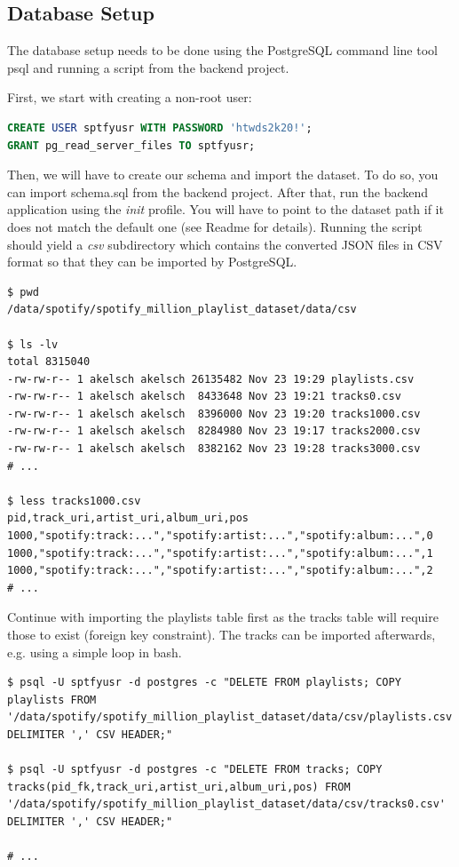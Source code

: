 \subsection{Database Setup}

The database setup needs to be done using the PostgreSQL command line tool psql and running a script from the backend project.

First, we start with creating a non-root user:

\begin{lstlisting}[caption={Creating a user in PostgreSQL}, style=Base, language=SQL]
CREATE USER sptfyusr WITH PASSWORD 'htwds2k20!';
GRANT pg_read_server_files TO sptfyusr;
\end{lstlisting}

Then, we will have to create our schema and import the dataset. To do so, you can import schema.sql from the backend project. After that, run the backend application using the \textit{init} profile. You will have to point to the dataset path if it does not match the default one (see Readme for details). Running the script should yield a \textit{csv} subdirectory which contains the converted \acs{JSON} files in \acs{CSV} format so that they can be imported by PostgreSQL.

\begin{lstlisting}[caption={Expected \acs{CSV} output after running the init script}, style=Terminal]
$ pwd
/data/spotify/spotify_million_playlist_dataset/data/csv

$ ls -lv
total 8315040
-rw-rw-r-- 1 akelsch akelsch 26135482 Nov 23 19:29 playlists.csv
-rw-rw-r-- 1 akelsch akelsch  8433648 Nov 23 19:21 tracks0.csv
-rw-rw-r-- 1 akelsch akelsch  8396000 Nov 23 19:20 tracks1000.csv
-rw-rw-r-- 1 akelsch akelsch  8284980 Nov 23 19:17 tracks2000.csv
-rw-rw-r-- 1 akelsch akelsch  8382162 Nov 23 19:28 tracks3000.csv
# ...

$ less tracks1000.csv
pid,track_uri,artist_uri,album_uri,pos
1000,"spotify:track:...","spotify:artist:...","spotify:album:...",0
1000,"spotify:track:...","spotify:artist:...","spotify:album:...",1
1000,"spotify:track:...","spotify:artist:...","spotify:album:...",2
# ...
\end{lstlisting}

Continue with importing the playlists table first as the tracks table will require those to exist (foreign key constraint). The tracks can be imported afterwards, e.g. using a simple loop in bash.

\begin{lstlisting}[caption={Importing \acs{CSV} files into PostgreSQL}, style=Terminal]
$ psql -U sptfyusr -d postgres -c "DELETE FROM playlists; COPY playlists FROM '/data/spotify/spotify_million_playlist_dataset/data/csv/playlists.csv' DELIMITER ',' CSV HEADER;"

$ psql -U sptfyusr -d postgres -c "DELETE FROM tracks; COPY tracks(pid_fk,track_uri,artist_uri,album_uri,pos) FROM '/data/spotify/spotify_million_playlist_dataset/data/csv/tracks0.csv' DELIMITER ',' CSV HEADER;"

# ...
\end{lstlisting}

